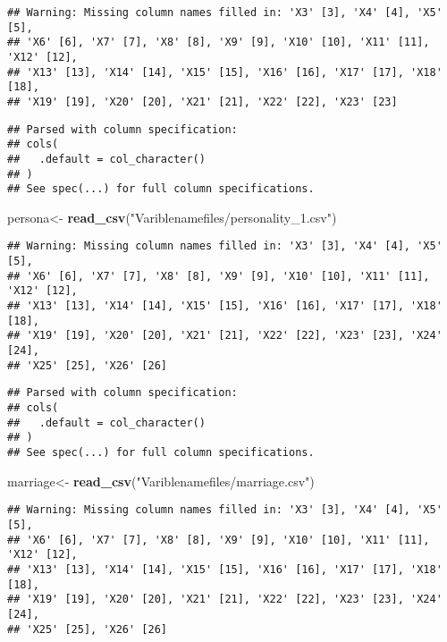 \documentclass[]{article}
\newenvironment{Shaded}{\begin{snugshade}}{\end{snugshade}}
\newcommand{\KeywordTok}[1]{\textcolor[rgb]{0.13,0.29,0.53}{\textbf{#1}}}
\newcommand{\StringTok}[1]{\textcolor[rgb]{0.31,0.60,0.02}{#1}}
\newcommand{\NormalTok}[1]{#1}
\begin{document}
\begin{verbatim}
## Warning: Missing column names filled in: 'X3' [3], 'X4' [4], 'X5' [5],
## 'X6' [6], 'X7' [7], 'X8' [8], 'X9' [9], 'X10' [10], 'X11' [11], 'X12' [12],
## 'X13' [13], 'X14' [14], 'X15' [15], 'X16' [16], 'X17' [17], 'X18' [18],
## 'X19' [19], 'X20' [20], 'X21' [21], 'X22' [22], 'X23' [23]
\end{verbatim}

\begin{verbatim}
## Parsed with column specification:
## cols(
##   .default = col_character()
## )
## See spec(...) for full column specifications.
\end{verbatim}

\begin{Shaded}
\begin{Highlighting}[]
\NormalTok{persona<-}\StringTok{ }\KeywordTok{read_csv}\NormalTok{(}\StringTok{"Variblenamefiles/personality_1.csv"}\NormalTok{)}
\end{Highlighting}
\end{Shaded}

\begin{verbatim}
## Warning: Missing column names filled in: 'X3' [3], 'X4' [4], 'X5' [5],
## 'X6' [6], 'X7' [7], 'X8' [8], 'X9' [9], 'X10' [10], 'X11' [11], 'X12' [12],
## 'X13' [13], 'X14' [14], 'X15' [15], 'X16' [16], 'X17' [17], 'X18' [18],
## 'X19' [19], 'X20' [20], 'X21' [21], 'X22' [22], 'X23' [23], 'X24' [24],
## 'X25' [25], 'X26' [26]
\end{verbatim}

\begin{verbatim}
## Parsed with column specification:
## cols(
##   .default = col_character()
## )
## See spec(...) for full column specifications.
\end{verbatim}

\begin{Shaded}
\begin{Highlighting}[]
\NormalTok{marriage<-}\StringTok{ }\KeywordTok{read_csv}\NormalTok{(}\StringTok{"Variblenamefiles/marriage.csv"}\NormalTok{)}
\end{Highlighting}
\end{Shaded}

\begin{verbatim}
## Warning: Missing column names filled in: 'X3' [3], 'X4' [4], 'X5' [5],
## 'X6' [6], 'X7' [7], 'X8' [8], 'X9' [9], 'X10' [10], 'X11' [11], 'X12' [12],
## 'X13' [13], 'X14' [14], 'X15' [15], 'X16' [16], 'X17' [17], 'X18' [18],
## 'X19' [19], 'X20' [20], 'X21' [21], 'X22' [22], 'X23' [23], 'X24' [24],
## 'X25' [25], 'X26' [26]
\end{verbatim}
\end{document}
